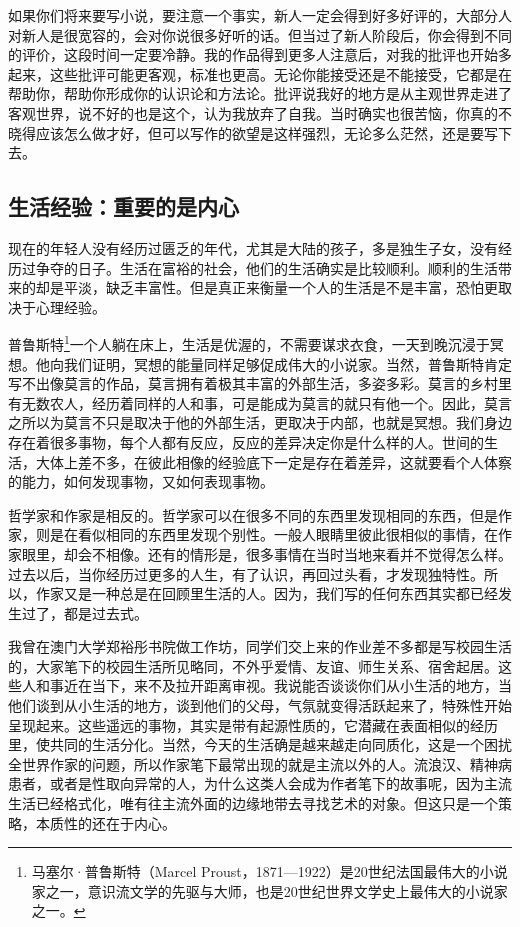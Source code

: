 \documentclass[12pt,a5paper]{ctexbook}
\begin{document}
如果你们将来要写小说，要注意一个事实，新人一定会得到好多好评的，大部分人对新人是很宽容的，会对你说很多好听的话。但当过了新人阶段后，你会得到不同的评价，这段时间一定要冷静。我的作品得到更多人注意后，对我的批评也开始多起来，这些批评可能更客观，标准也更高。无论你能接受还是不能接受，它都是在帮助你，帮助你形成你的认识论和方法论。批评说我好的地方是从主观世界走进了客观世界，说不好的也是这个，认为我放弃了自我。当时确实也很苦恼，你真的不晓得应该怎么做才好，但可以写作的欲望是这样强烈，无论多么茫然，还是要写下去。

\subsection{生活经验：重要的是内心}
现在的年轻人没有经历过匮乏的年代，尤其是大陆的孩子，多是独生子女，没有经历过争夺的日子。生活在富裕的社会，他们的生活确实是比较顺利。顺利的生活带来的却是平淡，缺乏丰富性。但是真正来衡量一个人的生活是不是丰富，恐怕更取决于心理经验。

普鲁斯特\footnote{马塞尔·普鲁斯特（Marcel Proust，1871—1922）是20世纪法国最伟大的小说家之一，意识流文学的先驱与大师，也是20世纪世界文学史上最伟大的小说家之一。}一个人躺在床上，生活是优渥的，不需要谋求衣食，一天到晚沉浸于冥想。他向我们证明，冥想的能量同样足够促成伟大的小说家。当然，普鲁斯特肯定写不出像莫言的作品，莫言拥有着极其丰富的外部生活，多姿多彩。莫言的乡村里有无数农人，经历着同样的人和事，可是能成为莫言的就只有他一个。因此，莫言之所以为莫言不只是取决于他的外部生活，更取决于内部，也就是冥想。我们身边存在着很多事物，每个人都有反应，反应的差异决定你是什么样的人。世间的生活，大体上差不多，在彼此相像的经验底下一定是存在着差异，这就要看个人体察的能力，如何发现事物，又如何表现事物。

哲学家和作家是相反的。哲学家可以在很多不同的东西里发现相同的东西，但是作家，则是在看似相同的东西里发现个别性。一般人眼睛里彼此很相似的事情，在作家眼里，却会不相像。还有的情形是，很多事情在当时当地来看并不觉得怎么样。过去以后，当你经历过更多的人生，有了认识，再回过头看，才发现独特性。所以，作家又是一种总是在回顾里生活的人。因为，我们写的任何东西其实都已经发生过了，都是过去式。

我曾在澳门大学郑裕彤书院做工作坊，同学们交上来的作业差不多都是写校园生活的，大家笔下的校园生活所见略同，不外乎爱情、友谊、师生关系、宿舍起居。这些人和事近在当下，来不及拉开距离审视。我说能否谈谈你们从小生活的地方，当他们谈到从小生活的地方，谈到他们的父母，气氛就变得活跃起来了，特殊性开始呈现起来。这些遥远的事物，其实是带有起源性质的，它潜藏在表面相似的经历里，使共同的生活分化。当然，今天的生活确是越来越走向同质化，这是一个困扰全世界作家的问题，所以作家笔下最常出现的就是主流以外的人。流浪汉、精神病患者，或者是性取向异常的人，为什么这类人会成为作者笔下的故事呢，因为主流生活已经格式化，唯有往主流外面的边缘地带去寻找艺术的对象。但这只是一个策略，本质性的还在于内心。
\end{document}
